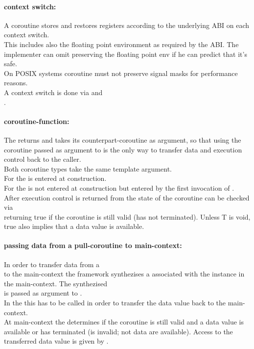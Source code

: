 \paragraph*{context switch:}
A coroutine stores and restores registers according to the underlying ABI on
each context switch.\\
\newline
This includes also the floating point environment as required by the ABI. The
implementer can omit preserving the floating point env if he can predict that
it's safe.\\
\newline
On POSIX systems coroutine must not preserve signal masks for performance
reasons.\\
\newline
A context switch is done via \pushcoroop and\\
\pullcoroop.

\paragraph*{coroutine-function:}
The \corofunction returns  and takes its counterpart-coroutine as
argument, so that using the coroutine passed as argument to \corofunction is the
only way to transfer data and execution control back to the caller.\\
Both coroutine types take the same template argument.\\
For \pullcoro the \corofunction is entered at \pullcoro construction.\\
For \pushcoro the \corofunction is not entered at \pushcoro construction but
entered by the first invocation of \pushcoroop.\\
After execution control is returned from \corofunction the state of the
coroutine can be checked via\\
\pullcorobool returning true if the coroutine is still valid (\corofunction has
not terminated). Unless T is void, true also implies that a data value is
available.

\paragraph*{passing data from a pull-coroutine to main-context:}
In order to transfer data from a\\
\pullcoro to the main-context the framework synthezises a \pushcoro associated
with the \pullcoro instance in the main-context. The synthezised\\
\pushcoro is passed as argument to \corofunction.\\
In the \corofunction this \pushcoroop has to be called in order to transfer the
data value back to the main-context.\\
At main-context the \pullcorobool determines if the coroutine is still valid and
a data value is available or \corofunction has terminated (\pullcoro is invalid;
not data are available). Access to the transferred data value is given by
\pullcoroget.

